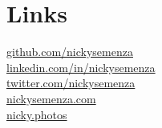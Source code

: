 \documentclass[]{resume-openfont}
\begin{document}
\begin{minipage}[t]{0.26\textwidth}

\section{\textcolor{primary5}{Links}}
\href{https://github.com/nickysemenza}{github.com/nickysemenza} \\
\href{https://www.linkedin.com/in/nickysemenza}{linkedin.com/in/nickysemenza} \\
\href{https://twitter.com/nickysemenza}{twitter.com/nickysemenza} \\
\href{https://nickysemenza.com}{nickysemenza.com} \\
\href{https://nicky.photos}{nicky.photos} \\
\sectionsep



%
%

\end{minipage} 
\hfill
\end{document}
